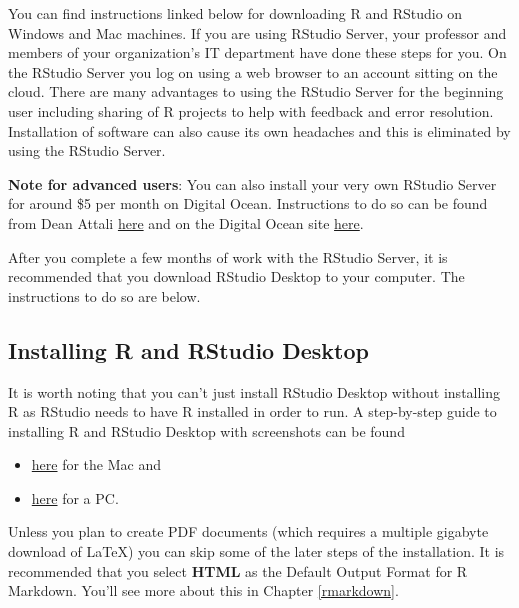 \documentclass[]{tufte-book}
\providecommand{\tightlist}{%
  \setlength{\itemsep}{0pt}\setlength{\parskip}{0pt}}
\begin{document}
You can find instructions linked below for downloading R and RStudio on
Windows and Mac machines. If you are using RStudio Server, your
professor and members of your organization's IT department have done
these steps for you. On the RStudio Server you log on using a web
browser to an account sitting on the cloud. There are many advantages to
using the RStudio Server for the beginning user including sharing of R
projects to help with feedback and error resolution. Installation of
software can also cause its own headaches and this is eliminated by
using the RStudio Server.

\textbf{Note for advanced users}: You can also install your very own
RStudio Server for around \$5 per month on Digital Ocean. Instructions
to do so can be found from Dean Attali
\href{http://deanattali.com/2015/05/09/setup-rstudio-shiny-server-digital-ocean/}{here}
and on the Digital Ocean site
\href{https://www.digitalocean.com/community/tutorials/how-to-set-up-rstudio-on-an-ubuntu-cloud-server}{here}.

After you complete a few months of work with the RStudio Server, it is
recommended that you download RStudio Desktop to your computer. The
instructions to do so are below.

\subsection{Installing R and RStudio
Desktop}\label{installing-r-and-rstudio-desktop}

It is worth noting that you can't just install RStudio Desktop without
installing R as RStudio needs to have R installed in order to run. A
step-by-step guide to installing R and RStudio Desktop with screenshots
can be found

\begin{itemize}
\tightlist
\item
  \href{http://www.reed.edu/data-at-reed/software/R/r_studio.html}{here}
  for the Mac and
\item
  \href{http://www.reed.edu/data-at-reed/software/R/r_studio_pc.html}{here}
  for a PC.
\end{itemize}

Unless you plan to create PDF documents (which requires a multiple
gigabyte download of LaTeX) you can skip some of the later steps of the
installation. It is recommended that you select \textbf{HTML} as the
Default Output Format for R Markdown. You'll see more about this in
Chapter \ref{rmarkdown}.
\end{document}
